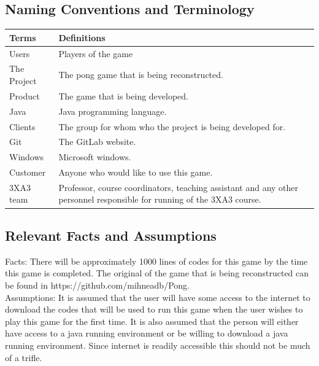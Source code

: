 \documentclass[12pt,letterpaper]{article}
\begin{document}
\subsection{Naming Conventions and Terminology}
\begin{tabular}{|p{3cm}|p{8cm}|}
\hline
\textbf{Terms}    & \textbf{Definitions}                                                                                                                                                                                                                                                                                                                                                                                                                                \\\hline
Users &                                                                                                                                                                                            Players of the game \\\hline
The Project  & The pong game that is being reconstructed. \\\hline
Product       & The game that is being developed.
 \\\hline
Java            & Java programming language.
 \\\hline
Clients          & 	The group for whom who the project is being developed for.
 \\\hline
Git        & The GitLab website.
 \\\hline
Windows       & Microsoft windows.
 \\\hline
Customer         & Anyone who would like to use this game.
 \\\hline
3XA3 team        & Professor, course coordinators, teaching assistant and any other personnel responsible for running of the 3XA3 course.
 \\\hline
\end{tabular}
	\subsection{Relevant Facts and Assumptions}
Facts:
There will be approximately 1000 lines of codes for this game by the time this game is completed. The original of the game that is being reconstructed can be found in https://github.com/mihneadb/Pong.\\  
\noindent Assumptions:
It is assumed that the user will have some access to the internet to download the codes that will be used to run this game when the user wishes to play this game for the first time. It is also assumed that the person will either have access to a java running environment or be willing to download a java running environment. Since internet is readily accessible this should not be much of a trifle.
	
\end{document}

